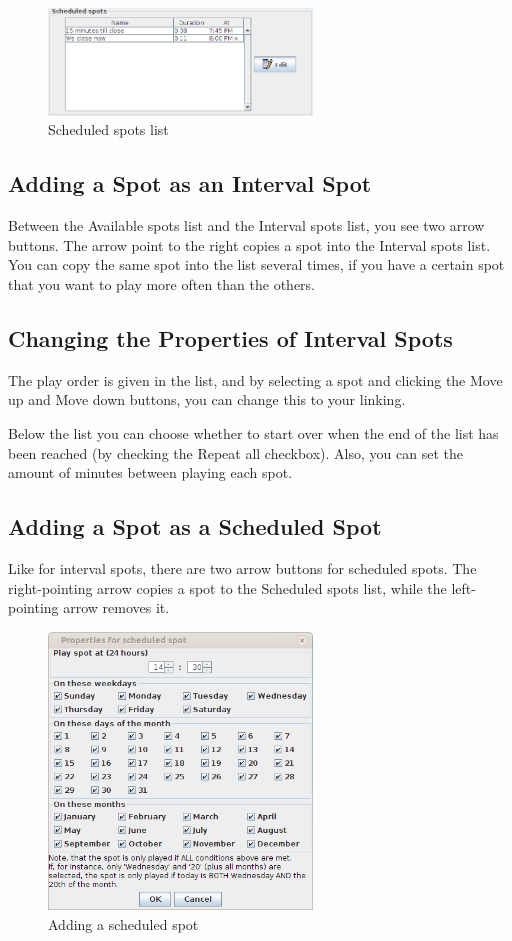 \documentclass[a4paper,12pt]{report}
\begin{document}
\begin{figure}[h]
\centering \includegraphics[width=70mm]{scheduledspotslist.png}
\caption{Scheduled spots list}
\label{scheduledspotslist}
\end{figure}

\subsection{Adding a Spot as an Interval Spot}
Between the Available spots list and the Interval spots list, you see two arrow
buttons. The arrow point to the right copies a spot into the Interval spots
list. You can copy the same spot into the list several times, if you have a
certain spot that you want to play more often than the others.

\subsection{Changing the Properties of Interval Spots}
The play order is given in the list, and by selecting a spot and clicking the
Move up and Move down buttons, you can change this to your linking.

Below the list you can choose whether to start over when the end of the list has
been reached (by checking the Repeat all checkbox). Also, you can set the amount
of minutes between playing each spot.

\subsection{Adding a Spot as a Scheduled Spot}
\label{sec:addscheduledspot}
Like for interval spots, there are two arrow buttons for scheduled spots. The
right-pointing arrow copies a spot to the Scheduled spots list, while the
left-pointing arrow removes it.

\begin{figure}[h]
\centering \includegraphics[width=70mm]{scheduledspotdialogue.png}
\caption{Adding a scheduled spot}
\end{figure}
\end{document}
